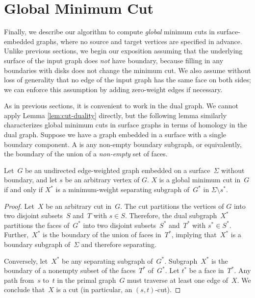 \documentclass[letterpaper,review]{siamart190516}
\def\Cut{X}
\begin{document}
{%
\def\minSS{X}

\section{Global Minimum Cut}
\label{sec:global}

Finally, we describe our algorithm to compute \emph{global} minimum cuts in surface-embedded graphs, where no source and target vertices are specified in advance.  
Unlike previous sections, we begin our exposition assuming that the underlying surface of the input
graph does \emph{not} have boundary, because filling in any boundaries with disks does not change
the minimum cut.
We also assume without loss of generality that no edge of the input graph has the same face on both
sides; we can enforce this assumption by adding zero-weight edges if necessary.

As in previous sections, it is convenient to work in the dual graph.  We cannot apply Lemma \ref{lem:cut-duality} directly, but the following lemma similarly characterizes global minimum cuts in surface graphs in terms of homology in the dual graph.
Suppose we have a graph embedded in a surface with a single boundary component.
A  is any non-empty boundary subgraph, or equivalently, the boundary of the union of a \emph{non-empty} set of faces.

\begin{lemma}
\label{lem:mincut-z2}
Let~$G$ be an undirected edge-weighted graph embedded on a surface~$\Sigma$ without boundary, and
let $s$ be an arbitrary vertex of $G$.
$\Cut$ is a global minimum cut in~$G$ if and only if $\Cut^*$ is a minimum-weight separating subgraph
of~$G^*$ in $\Sigma \setminus s^*$.
\end{lemma}

\begin{proof}
  Let~$\Cut$ be an arbitrary cut in~$G$.  The cut partitions the vertices of $G$
  into two disjoint subsets~$S$ and~$T$ with $s \in S$.
  Therefore, the dual subgraph~$\Cut^*$
  partitions the faces of~$G^*$ into two disjoint subsets~$S^*$ and~$T^*$ with $s^* \in S^*$.
  Further,~$\Cut^*$ is the boundary of the union of faces in~$T^*$, implying
  that~$\Cut^*$ is a boundary subgraph of~$\Sigma$ and therefore separating.

  Conversely, let~$\Cut^*$ be any separating subgraph of~$G^*$.
  Subgraph~$\Cut^*$ is the boundary of a nonempty subset of the faces~$T^*$
  of~$G^*$.
  Let $t^*$ be a face in~$T^*$.
  Any path from~$s$ to~$t$ in the primal
  graph~$G$ must traverse at least one edge of~$\Cut$.  We conclude that~$\Cut$ is
  a cut (in particular, an $(s,t)$-cut).
\end{proof}

}
\end{document}
